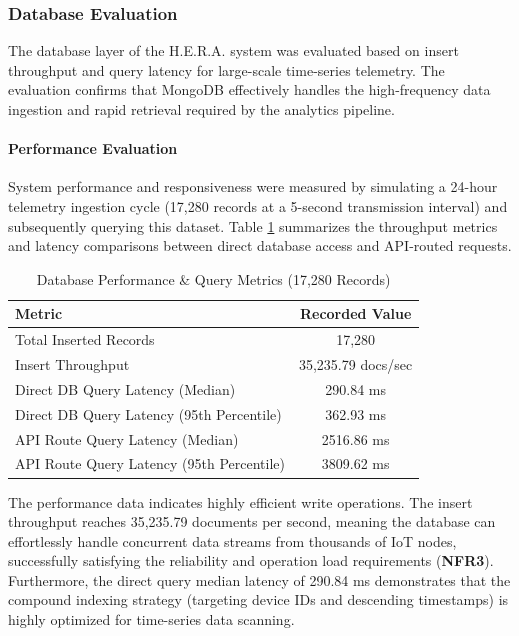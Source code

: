 \subsubsection{Database Evaluation}

The database layer of the H.E.R.A. system was evaluated based on insert throughput and query latency for large-scale time-series telemetry. The evaluation confirms that MongoDB effectively handles the high-frequency data ingestion and rapid retrieval required by the analytics pipeline.

\paragraph{Performance Evaluation}
System performance and responsiveness were measured by simulating a 24-hour telemetry ingestion cycle (17,280 records at a 5-second transmission interval) and subsequently querying this dataset. Table \ref{tab:db_performance} summarizes the throughput metrics and latency comparisons between direct database access and API-routed requests.

\begin{table}[H]
\centering
\caption{Database Performance \& Query Metrics (17,280 Records)}
\label{tab:db_performance}
\begin{tabular}{lc}
\hline
\textbf{Metric} & \textbf{Recorded Value} \\ \hline
Total Inserted Records & 17,280 \\
Insert Throughput & 35,235.79 docs/sec \\
Direct DB Query Latency (Median) & 290.84 ms \\
Direct DB Query Latency (95th Percentile) & 362.93 ms \\
API Route Query Latency (Median) & 2516.86 ms \\ 
API Route Query Latency (95th Percentile) & 3809.62 ms \\ \hline
\end{tabular}
\end{table}

The performance data indicates highly efficient write operations. The insert throughput reaches 35,235.79 documents per second, meaning the database can effortlessly handle concurrent data streams from thousands of IoT nodes, successfully satisfying the reliability and operation load requirements (\textbf{NFR3}). Furthermore, the direct query median latency of 290.84 ms demonstrates that the compound indexing strategy (targeting device IDs and descending timestamps) is highly optimized for time-series data scanning. \\

